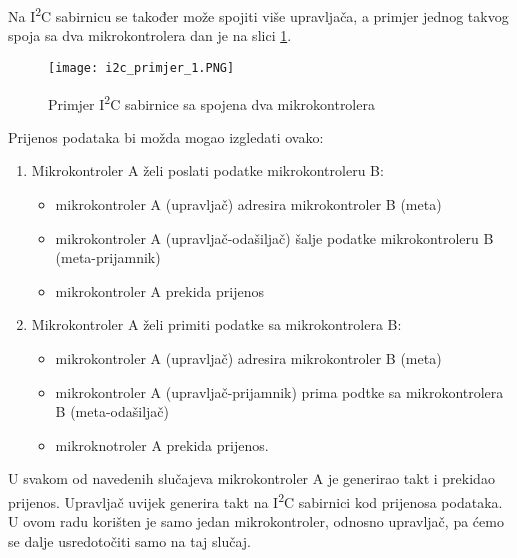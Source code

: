 Na I\textsuperscript{2}C sabirnicu se također može spojiti više upravljača, a primjer jednog takvog spoja sa dva mikrokontrolera dan je na slici \ref{fig:i2c_primjer_1}.
\begin{figure}[hp]
	\centering
	\texttt{[image: i2c\_primjer\_1.PNG]}
	\caption{Primjer I\textsuperscript{2}C sabirnice sa spojena dva
	mikrokontrolera \cite{i2c_manual}}
	\label{fig:i2c_primjer_1}
\end{figure}
Prijenos podataka bi možda mogao izgledati ovako:
\begin{enumerate}
	\item Mikrokontroler A želi poslati podatke mikrokontroleru B:
	\begin{itemize}
		\item mikrokontroler A (upravljač) adresira mikrokontroler B (meta)
		\item mikrokontroler A (upravljač-odašiljač) šalje podatke
		mikrokontroleru B (meta-prijamnik)
		\item mikrokontroler A prekida prijenos
	\end{itemize}
	\item Mikrokontroler A želi primiti podatke sa mikrokontrolera B:
		\begin{itemize}
		\item mikrokontroler A (upravljač) adresira mikrokontroler B (meta)
		\item mikrokontroler A (upravljač-prijamnik) prima podtke sa
		mikrokontrolera B (meta-odašiljač)
		\item mikroknotroler A prekida prijenos.
	\end{itemize}
\end{enumerate}
U svakom od navedenih slučajeva mikrokontroler A je generirao takt i prekidao prijenos. Upravljač uvijek generira takt na I\textsuperscript{2}C sabirnici kod prijenosa podataka. U ovom radu korišten je samo jedan mikrokontroler, odnosno upravljač, pa ćemo se dalje usredotočiti samo na taj slučaj.

